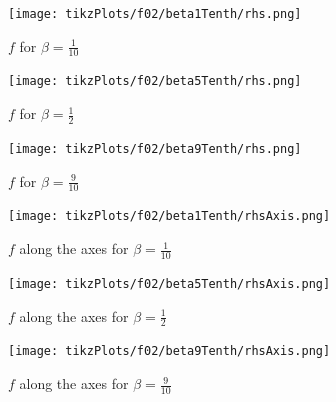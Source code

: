 \documentclass[draft=false,twoside,12pt]{scrreprt}
\begin{document}
\vspace{-\parskip}
\begin{minipage}[t]{0.3\textwidth}
  \begin{figure}[H]
	  \centering
		\texttt{[image: tikzPlots/f02/beta1Tenth/rhs.png]} 
    \caption{$f$ for $\beta=\frac{1}{10}$}
  \end{figure}
\end{minipage}
\hfill
\vline
\hfill
\begin{minipage}[t]{0.3\textwidth}
  \begin{figure}[H]
	  \centering
		\texttt{[image: tikzPlots/f02/beta5Tenth/rhs.png]} 
    \caption{$f$ for $\beta=\frac{1}{2}$}
  \end{figure}
\end{minipage}
\hfill
\vline
\hfill
\begin{minipage}[t]{0.3\textwidth}
  \begin{figure}[H]
	  \centering
		\texttt{[image: tikzPlots/f02/beta9Tenth/rhs.png]} 
    \caption{$f$ for $\beta=\frac{9}{10}$}
  \end{figure}
\end{minipage}

\vspace{-\parskip}
\begin{minipage}[t]{0.3\textwidth}
  \begin{figure}[H]
	  \centering
		\texttt{[image: tikzPlots/f02/beta1Tenth/rhsAxis.png]} 
    \caption{$f$ along the axes for $\beta=\frac{1}{10}$}
  \end{figure}
\end{minipage}
\hfill
\vline
\hfill
\begin{minipage}[t]{0.3\textwidth}
  \begin{figure}[H]
	  \centering
		\texttt{[image: tikzPlots/f02/beta5Tenth/rhsAxis.png]} 
    \caption{$f$ along the axes for $\beta=\frac{1}{2}$}
  \end{figure}
\end{minipage}
\hfill
\vline
\hfill
\begin{minipage}[t]{0.3\textwidth}
  \begin{figure}[H]
	  \centering
		\texttt{[image: tikzPlots/f02/beta9Tenth/rhsAxis.png]} 
    \caption{$f$ along the axes for $\beta=\frac{9}{10}$}
  \end{figure}
\end{minipage}
\end{document}
